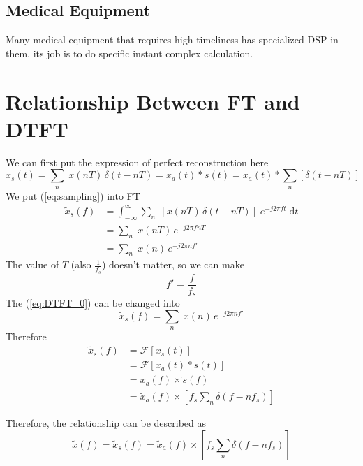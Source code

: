 \documentclass{article}
\begin{document}
\subsection{Medical Equipment}
Many medical equipment that requires high timeliness has specialized DSP in them, its job is to do specific instant complex calculation.

\section{Relationship Between FT and DTFT}
We can first put the expression of perfect reconstruction here
\begin{equation}
x_s(t) = \sum_{n} \; x(nT) \, \delta(t - nT) = x_a(t) * s(t) =  x_a(t) * \sum_{n} \left[ \delta(t- nT) \right]
\label{eq:sampling}
\end{equation}
We put (\ref{eq:sampling}) into FT
\begin{equation}
\begin{aligned}
	\widetilde{x}_s(f) &= \int_{- \infty}^{\infty} \sum_{n} \; \left[  x(nT) \, \delta(t - nT) \right] \; e^{-j 2\pi ft}\; \mathrm{d} t \\
	&= \sum_{n} \; x(nT)  \, e^{-j 2\pi f nT} \\ 
	&=\sum_{n} \; x(n)  \, e^{-j 2\pi n f'}
\end{aligned}
\label{eq:DTFT_0}
\end{equation}
The value of $T$ (also $\frac{1}{f_s}$) doesn't matter, so we can make 
$$
f' = \frac{f}{f_s} 
$$
The (\ref{eq:DTFT_0}) can be changed into
\begin{equation*}
\widetilde{x}_s(f) = \sum_{n} \; x(n)  \, e^{-j 2\pi n f'}
\end{equation*}
Therefore
\begin{equation*}
\begin{aligned}
\widetilde{x}_s(f) &= \mathcal{F} \left[ x_s(t) \right] \\ 
&= \mathcal{F} \left[ x_a(t) * s(t) \right] \\ 
&= \widetilde{x}_a(f) \times \widetilde{s}(f) \\ 
&= \widetilde{x}_a(f) \times \left[ f_s \sum_n \delta(f - nf_s) \right]
\end{aligned}
\end{equation*}

Therefore, the relationship can be described as
\begin{equation}
	\widetilde{x}(f) = \widetilde{x}_s(f) = \widetilde{x}_a(f) \times \left[ f_s \sum_n \delta(f - nf_s) \right]
\label{eq:relationship}
\end{equation}
\end{document}
